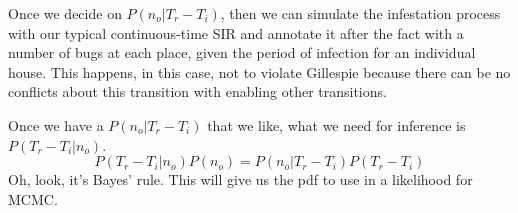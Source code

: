\documentclass{article}
\begin{document}
Once we decide on $P(n_o|T_r-T_i)$, then we can simulate the
infestation process with our typical continuous-time SIR
and annotate it after the fact with a number of bugs at each place,
given the period of infection for an individual house.
This happens, in this case, not to violate Gillespie because there
can be no conflicts about this transition with enabling other
transitions.

Once we have a $P(n_o|T_r-T_i)$ that we like, what we need for
inference is $P(T_r-T_i|n_o)$.
\begin{equation}
  P(T_r-T_i|n_o)P(n_o)=P(n_o|T_r-T_i)P(T_r-T_i)
\end{equation}
Oh, look, it's Bayes' rule. This will give us the pdf to use
in a likelihood for MCMC.
\end{document}
